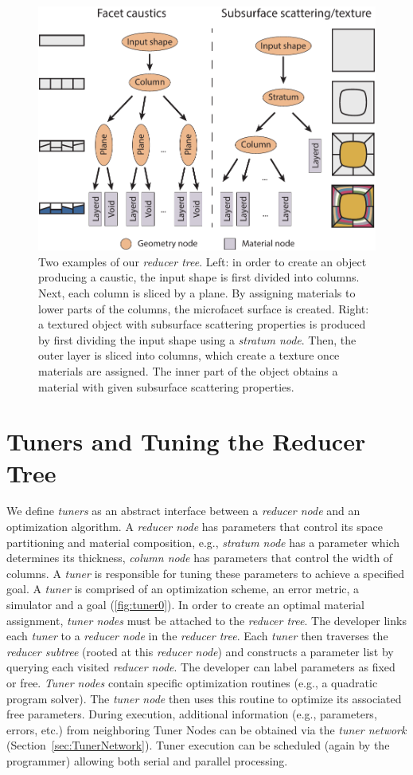 \begin{figure}[h]
\includegraphics[width=0.7\linewidth]{figure/redNetworkNew.pdf}
\caption{Two examples of our \emph{reducer tree}. Left: in order to create an object producing a caustic, the input shape is first divided into columns. Next, each column is sliced by a plane.
By assigning materials to lower parts of the columns, the microfacet surface is created.
Right: a textured object with subsurface scattering properties is produced by first dividing the input shape using a \emph{stratum node}. Then, the outer layer is sliced into columns, which create a texture once materials are assigned. The inner part of the object obtains a material with given subsurface scattering properties.  
}
\label{fig:red1}
\end{figure}

\section{Tuners and Tuning the Reducer Tree}
We define \emph{tuners} as an abstract interface between a \emph{reducer node} and an optimization algorithm. 
A \emph{reducer node} has parameters that control its space partitioning and material composition, e.g., \emph{stratum node} has a parameter which determines its thickness, \emph{column node} has parameters that control the width of columns.
A \emph{tuner} is responsible for tuning these parameters to achieve a specified goal.
A \emph{tuner} is comprised of an optimization scheme, an error metric, a simulator and a goal (\autoref{fig:tuner0}). 
In order to create an optimal material assignment, \emph{tuner nodes} must be attached to the \emph{reducer tree}. The developer links each \emph{tuner} to a \emph{reducer node} in the \emph{reducer tree}. Each \emph{tuner} then traverses the \emph{reducer subtree} (rooted at this \emph{reducer node}) and constructs a parameter list by querying each visited \emph{reducer node}. The developer can label parameters as fixed or free. \emph{Tuner nodes} contain specific optimization routines (e.g., a quadratic program solver). The \emph{tuner node} then uses this routine to optimize its associated free parameters. During execution, additional information (e.g., parameters, errors, etc.) from neighboring Tuner Nodes can be obtained via the \emph{tuner network} (Section~\ref{sec:TunerNetwork}).  Tuner execution can be scheduled (again by the programmer) allowing both serial and parallel processing. 

